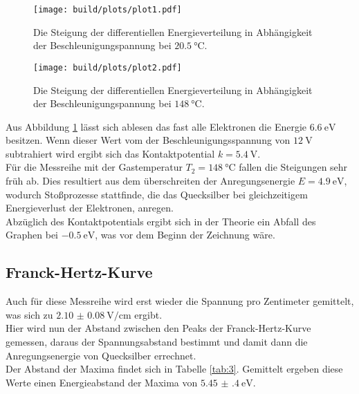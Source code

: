 \begin{figure}[H]
    \centering
    \texttt{[image: build/plots/plot1.pdf]}
    \caption{Die Steigung der differentiellen Energieverteilung in Abhängigkeit der Beschleunigungspannung bei $\SI{20.5}{\celsius}$.}
    \label{img:1}
\end{figure}

\begin{figure}[H]
    \centering
    \texttt{[image: build/plots/plot2.pdf]}
    \caption{Die Steigung der differentiellen Energieverteilung in Abhängigkeit der Beschleunigungspannung bei $\SI{148}{\celsius}$.}
    \label{img:2}
\end{figure}

\noindent
Aus Abbildung \ref{img:1} lässt sich ablesen das fast alle Elektronen die Energie $\SI{6.6}{\eV}$ besitzen. 
Wenn dieser Wert vom der Beschleunigungsspannung von $\SI{12}{\volt}$ subtrahiert wird ergibt sich das Kontaktpotential $k=\SI{5.4}{\volt}$.\\
Für die Messreihe mit der Gastemperatur $T_2=\SI{148}{\celsius}$ fallen die Steigungen sehr früh ab. 
Dies resultiert aus dem überschreiten der Anregungsenergie $E=\SI{4.9}{\eV}$\cite{theo}, wodurch Stoßprozesse stattfinde, die das Quecksilber bei gleichzeitigem Energieverlust der Elektronen, anregen.\\
Abzüglich des Kontaktpotentials ergibt sich in der Theorie ein Abfall des Graphen bei $\SI{-0.5}{\eV}$, was vor dem Beginn der Zeichnung wäre.


\subsection{Franck-Hertz-Kurve}

\noindent Auch für diese Messreihe wird erst wieder die Spannung pro Zentimeter gemittelt, was sich zu $\SI{2.10(8)}{\volt\per\centi\metre}$ ergibt.\\
Hier wird nun der Abstand zwischen den Peaks der Franck-Hertz-Kurve gemessen, daraus der Spannungsabstand bestimmt und damit dann die Anregungsenergie von Quecksilber errechnet.\\
Der Abstand der Maxima findet sich in Tabelle \ref{tab:3}. Gemittelt ergeben diese Werte einen Energieabstand der Maxima von $\SI{5.45(40)}{\eV}$.

